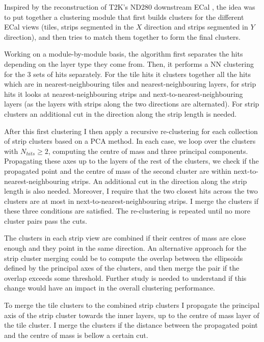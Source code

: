 Inspired by the reconstruction of T2K's ND280 downstream ECal \cite{T2KUK2013}, the idea was to put together a clustering module that first builds clusters for the different ECal views (tiles, strips segmented in the $X$ direction and strips segmented in $Y$ direction), and then tries to match them together to form the final clusters.

Working on a module-by-module basis, the algorithm first separates the hits depending on the layer type they come from. Then, it performs a NN clustering for the 3 sets of hits separately. For the tile hits it clusters together all the hits which are in nearest-neighbouring tiles and nearest-neighbouring layers, for strip hits it looks at nearest-neighbouring strips and next-to-nearest-neighbouring layers (as the layers with strips along the two directions are alternated). For strip clusters an additional cut in the direction along the strip length is needed.

After this first clustering I then apply a recursive re-clustering for each collection of strip clusters based on a PCA method. In each case, we loop over the clusters with $N_{hits}\geq2$, computing the centre of mass and three principal components. Propagating these axes up to the layers of the rest of the clusters, we check if the propagated point and the centre of mass of the second cluster are within next-to-nearest-neighbouring strips. An additional cut in the direction along the strip length is also needed. Moreover, I require that the two closest hits across the two clusters are at most in next-to-nearest-neighbouring strips. I merge the clusters if these three conditions are satisfied. The re-clustering is repeated until no more cluster pairs pass the cuts.

The clusters in each strip view are combined if their centres of mass are close enough and they point in the same direction. An alternative approach for the strip cluster merging could be to compute the overlap between the ellipsoids defined by the principal axes of the clusters, and then merge the pair if the overlap exceeds some threshold. Further study is needed to understand if this change would have an impact in the overall clustering performance.

To merge the tile clusters to the combined strip clusters I propagate the principal axis of the strip cluster towards the inner layers, up to the centre of mass layer of the tile cluster. I merge the clusters if the distance between the propagated point and the centre of mass is bellow a certain cut.

